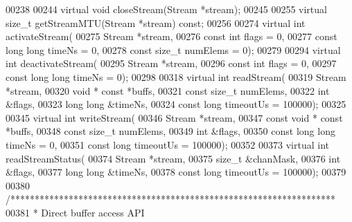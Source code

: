 \begin{DoxyCode}
00238 
00244     \textcolor{keyword}{virtual} \textcolor{keywordtype}{void} closeStream(Stream *stream);
00245 
00255     \textcolor{keyword}{virtual} \textcolor{keywordtype}{size\_t} getStreamMTU(Stream *stream) \textcolor{keyword}{const};
00256 
00274     \textcolor{keyword}{virtual} \textcolor{keywordtype}{int} activateStream(
00275         Stream *stream,
00276         \textcolor{keyword}{const} \textcolor{keywordtype}{int} flags = 0,
00277         \textcolor{keyword}{const} \textcolor{keywordtype}{long} \textcolor{keywordtype}{long} timeNs = 0,
00278         \textcolor{keyword}{const} \textcolor{keywordtype}{size\_t} numElems = 0);
00279 
00294     \textcolor{keyword}{virtual} \textcolor{keywordtype}{int} deactivateStream(
00295         Stream *stream,
00296         \textcolor{keyword}{const} \textcolor{keywordtype}{int} flags = 0,
00297         \textcolor{keyword}{const} \textcolor{keywordtype}{long} \textcolor{keywordtype}{long} timeNs = 0);
00298 
00318     \textcolor{keyword}{virtual} \textcolor{keywordtype}{int} readStream(
00319         Stream *stream,
00320         \textcolor{keywordtype}{void} * \textcolor{keyword}{const} *buffs,
00321         \textcolor{keyword}{const} \textcolor{keywordtype}{size\_t} numElems,
00322         \textcolor{keywordtype}{int} &flags,
00323         \textcolor{keywordtype}{long} \textcolor{keywordtype}{long} &timeNs,
00324         \textcolor{keyword}{const} \textcolor{keywordtype}{long} timeoutUs = 100000);
00325 
00345     \textcolor{keyword}{virtual} \textcolor{keywordtype}{int} writeStream(
00346         Stream *stream,
00347         \textcolor{keyword}{const} \textcolor{keywordtype}{void} * \textcolor{keyword}{const} *buffs,
00348         \textcolor{keyword}{const} \textcolor{keywordtype}{size\_t} numElems,
00349         \textcolor{keywordtype}{int} &flags,
00350         \textcolor{keyword}{const} \textcolor{keywordtype}{long} \textcolor{keywordtype}{long} timeNs = 0,
00351         \textcolor{keyword}{const} \textcolor{keywordtype}{long} timeoutUs = 100000);
00352 
00373     \textcolor{keyword}{virtual} \textcolor{keywordtype}{int} readStreamStatus(
00374         Stream *stream,
00375         \textcolor{keywordtype}{size\_t} &chanMask,
00376         \textcolor{keywordtype}{int} &flags,
00377         \textcolor{keywordtype}{long} \textcolor{keywordtype}{long} &timeNs,
00378         \textcolor{keyword}{const} \textcolor{keywordtype}{long} timeoutUs = 100000);
00379 
00380     \textcolor{comment}{/*******************************************************************}
00381 \textcolor{comment}{     * Direct buffer access API}

\end{DoxyCode}
